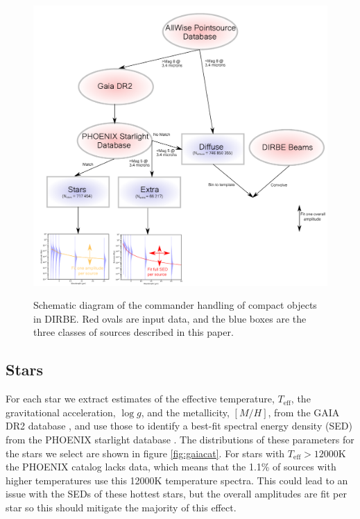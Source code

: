 \documentclass{aa}
\begin{document}
\begin{figure}
  \centering
  \includegraphics[width=\textwidth]{figs/diagram/dirbe_diagram.pdf}\\
  \caption{Schematic diagram of the commander handling of compact objects in DIRBE. Red ovals are input data, and the blue boxes are the three classes of sources described in this paper. }
  \label{fig:diagram}
\end{figure}

\subsection{Stars}

\label{sec:starmodel}

For each star we extract estimates of the effective temperature, $T_{\mathrm{eff}}$, the gravitational acceleration, $\log g$, and the metallicity, $[M/H]$, from the GAIA DR2 database \citep{gaiaCat}, and use those to identify a best-fit spectral energy density (SED) from the PHOENIX starlight database \citep{Husser_2013}. The distributions of these parameters for the stars we select are shown in figure \ref{fig:gaiacat}. For stars with $T_{\mathrm{eff}} > 12000$K the PHOENIX catalog lacks data, which means that the 1.1\% of sources with higher temperatures use this 12000K temperature spectra. This could lead to an issue with the SEDs of these hottest stars, but the overall amplitudes are fit per star so this should mitigate the majority of this effect.
\end{document}
